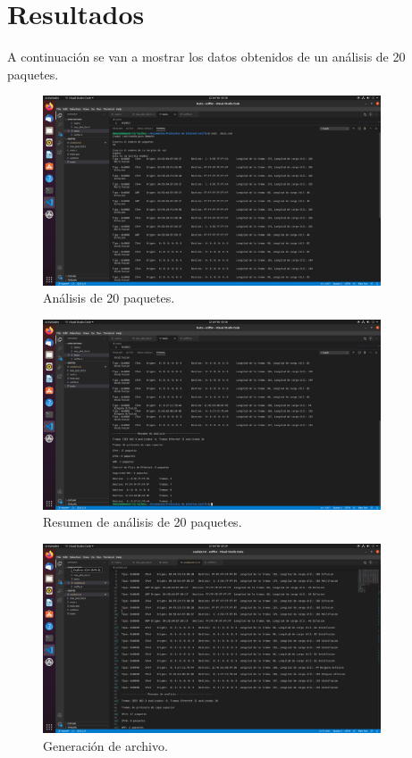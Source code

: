 \documentclass[12pt]{report}
\begin{document}
	\section*{Resultados}
	
	A continuación se van a mostrar los datos obtenidos de un análisis de 20 paquetes.
	
	\begin{figure}[!h]
		\centering
		\includegraphics[width=10cm]{images/prueba1.png}
		\caption{Análisis de 20 paquetes.}
	\end{figure}

	\begin{figure}[!h]
		\centering
		\includegraphics[width=10cm]{images/prueba1.1.png}
		\caption{Resumen de análisis de 20 paquetes.}
	\end{figure}

	\begin{figure}[!h]
		\centering
		\includegraphics[width=10cm]{images/prueba2.png}
		\caption{Generación de archivo.}
	\end{figure}
	
	
	
	
	
\end{document}
